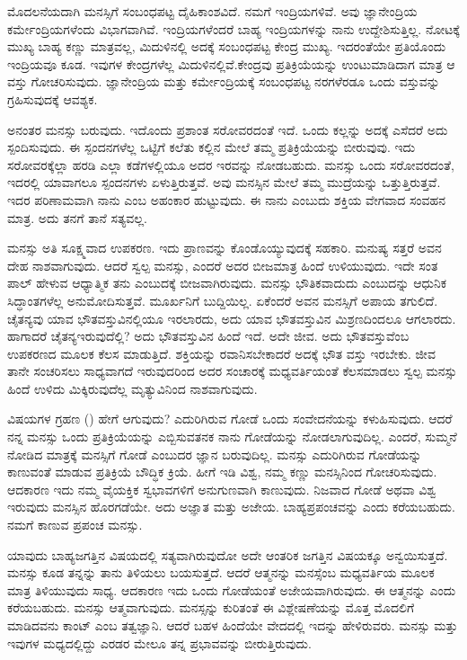 ಮೊದಲನೆಯದಾಗಿ ಮನಸ್ಸಿಗೆ ಸಂಬಂಧಪಟ್ಟ ದೈಹಿಕಾಂಶವಿದೆ. ನಮಗೆ ಇಂದ್ರಿಯಗಳಿವೆ. ಅವು ಜ್ಞಾನೇಂದ್ರಿಯ ಕರ್ಮೇಂದ್ರಿಯಗಳೆಂದು ವಿಭಾಗವಾಗಿವೆ. ಇಂದ್ರಿಯಗಳೆಂದರೆ ಬಾಹ್ಯ ಇಂದ್ರಿಯಗಳನ್ನು ನಾನು ಉದ್ದೇಶಿಸುತ್ತಿಲ್ಲ. ನೋಟಕ್ಕೆ ಮುಖ್ಯ ಬಾಹ್ಯ ಕಣ್ಣು ಮಾತ್ರವಲ್ಲ, ಮಿದುಳಿನಲ್ಲಿ ಅದಕ್ಕೆ ಸಂಬಂಧಪಟ್ಟ ಕೇಂದ್ರ ಮುಖ್ಯ. ಇದರಂತೆಯೇ ಪ್ರತಿಯೊಂದು ಇಂದ್ರಿಯವೂ ಕೂಡ. ಇವುಗಳ ಕೇಂದ್ರಗಳೆಲ್ಲ ಮಿದುಳಿನಲ್ಲಿವೆ.\break ಕೇಂದ್ರವು ಪ್ರತಿಕ್ರಿಯೆಯನ್ನು ಉಂಟುಮಾಡಿದಾಗ ಮಾತ್ರ ಆ ವಸ್ತು ಗೋಚರಿಸುವುದು. ಜ್ಞಾನೇಂದ್ರಿಯ ಮತ್ತು ಕರ್ಮೇಂದ್ರಿಯಕ್ಕೆ ಸಂಬಂಧಪಟ್ಟ ನರಗಳೆರಡೂ ಒಂದು ವಸ್ತುವನ್ನು ಗ್ರಹಿಸುವುದಕ್ಕೆ ಆವಶ್ಯಕ.

ಅನಂತರ ಮನಸ್ಸು ಬರುವುದು. ಇದೊಂದು ಪ್ರಶಾಂತ ಸರೋವರದಂತೆ ಇದೆ. ಒಂದು ಕಲ್ಲನ್ನು ಅದಕ್ಕೆ ಎಸೆದರೆ ಅದು ಸ್ಪಂದಿಸುವುದು. ಈ ಸ್ಪಂದನಗಳೆಲ್ಲ ಒಟ್ಟಿಗೆ ಕಲೆತು ಕಲ್ಲಿನ ಮೇಲೆ ತಮ್ಮ ಪ್ರತಿಕ್ರಿಯೆಯನ್ನು ಬೀರುವುವು. ಇದು ಸರೋವರಕ್ಕೆಲ್ಲಾ ಹರಡಿ ಎಲ್ಲಾ ಕಡೆಗಳಲ್ಲಿಯೂ ಅದರ ಇರವನ್ನು ನೋಡಬಹುದು. ಮನಸ್ಸು ಒಂದು ಸರೋವರದಂತೆ, ಇದರಲ್ಲಿ ಯಾವಾಗಲೂ ಸ್ಪಂದನಗಳು ಏಳುತ್ತಿರುತ್ತವೆ. ಅವು ಮನಸ್ಸಿನ ಮೇಲೆ ತಮ್ಮ ಮುದ್ರೆಯನ್ನು ಒತ್ತುತ್ತಿರುತ್ತವೆ. ಇದರ ಪರಿಣಾಮವಾಗಿ ನಾನು ಎಂಬ ಅಹಂಕಾರ ಹುಟ್ಟುವುದು. ಈ ನಾನು ಎಂಬುದು ಶಕ್ತಿಯ ವೇಗವಾದ ಸಂವಹನ ಮಾತ್ರ. ಅದು ತನಗೆ ತಾನೆ ಸತ್ಯವಲ್ಲ.

ಮನಸ್ಸು ಅತಿ ಸೂಕ್ಷ್ಮವಾದ ಉಪಕರಣ. ಇದು ಪ್ರಾಣವನ್ನು ಕೊಂಡೊಯ್ಯುವುದಕ್ಕೆ ಸಹಕಾರಿ. ಮನುಷ್ಯ ಸತ್ತರೆ ಅವನ ದೇಹ ನಾಶವಾಗುವುದು. ಆದರೆ ಸ್ವಲ್ಪ ಮನಸ್ಸು, ಎಂದರೆ ಅದರ ಬೀಜಮಾತ್ರ ಹಿಂದೆ ಉಳಿಯುವುದು. ಇದೇ ಸಂತ ಪಾಲ್ ಹೇಳುವ ಆಧ್ಯಾತ್ಮಿಕ ತನು ಎಂಬುದಕ್ಕೆ ಬೀಜವಾಗಿರುವುದು. ಮನಸ್ಸು ಭೌತಿಕವಾದುದು ಎಂಬುದನ್ನು ಆಧುನಿಕ ಸಿದ್ಧಾಂತಗಳೆಲ್ಲ ಅನುಮೋದಿಸುತ್ತವೆ. ಮೂರ್ಖನಿಗೆ ಬುದ್ದಿಯಿಲ್ಲ. ಏಕೆಂದರೆ ಅವನ ಮನಸ್ಸಿಗೆ ಅಪಾಯ ತಗುಲಿದೆ. ಚೈತನ್ಯವು ಯಾವ ಭೌತವಸ್ತುವಿನಲ್ಲಿಯೂ ಇರಲಾರದು, ಅದು ಯಾವ ಭೌತವಸ್ತುವಿನ ಮಿಶ್ರಣದಿಂದಲೂ ಆಗಲಾರದು. ಹಾಗಾದರೆ ಚೈತನ್ಯ\break ಇರುವುದೆಲ್ಲಿ? ಅದು ಭೌತವಸ್ತುವಿನ ಹಿಂದೆ ಇದೆ. ಅದೇ ಜೀವ. ಅದು ಭೌತವಸ್ತುವೆಂಬ ಉಪಕರಣದ ಮೂಲಕ ಕೆಲಸ ಮಾಡುತ್ತಿದೆ. ಶಕ್ತಿಯನ್ನು ರವಾನಿಸಬೇಕಾದರೆ ಅದಕ್ಕೆ ಭೌತ ವಸ್ತು ಇರಬೇಕು. ಜೀವ ತಾನೇ ಸಂಚರಿಸಲು ಸಾಧ್ಯವಾಗದೆ ಇರುವುದರಿಂದ ಅದರ ಸಂಚಾರಕ್ಕೆ ಮಧ್ಯವರ್ತಿಯಂತೆ ಕೆಲಸಮಾಡಲು ಸ್ವಲ್ಪ ಮನಸ್ಸು ಹಿಂದೆ ಉಳಿದು ಮಿಕ್ಕಿರುವುದೆಲ್ಲ ಮೃತ್ಯುವಿನಿಂದ ನಾಶವಾಗುವುದು.

ವಿಷಯಗಳ ಗ್ರಹಣ () ಹೇಗೆ ಆಗುವುದು? ಎದುರಿಗಿರುವ ಗೋಡೆ ಒಂದು ಸಂವೇದನೆಯನ್ನು ಕಳುಹಿಸುವುದು. ಆದರೆ ನನ್ನ ಮನಸ್ಸು ಒಂದು ಪ್ರತಿಕ್ರಿಯೆಯನ್ನು ಎಬ್ಬಿಸುವತನಕ ನಾನು ಗೋಡೆಯನ್ನು ನೋಡಲಾಗುವುದಿಲ್ಲ. ಎಂದರೆ, ಸುಮ್ಮನೆ ನೋಡಿದ ಮಾತ್ರಕ್ಕೆ ಮನಸ್ಸಿಗೆ ಗೋಡೆ ಎಂಬುದರ ಜ್ಞಾನ ಬರುವುದಿಲ್ಲ. ಮನಸ್ಸು ಎದುರಿಗಿರುವ ಗೋಡೆಯನ್ನು ಕಾಣುವಂತೆ ಮಾಡುವ ಪ್ರತಿಕ್ರಿಯೆ ಬೌದ್ಧಿಕ ಕ್ರಿಯೆ. ಹೀಗೆ ಇಡಿ ವಿಶ್ವ, ನಮ್ಮ ಕಣ್ಣು ಮನಸ್ಸಿನಿಂದ ಗೋಚರಿಸುವುದು. ಆದಕಾರಣ ಇದು ನಮ್ಮ ವೈಯಕ್ತಿಕ ಸ್ವಭಾವಗಳಿಗೆ ಅನುಗುಣವಾಗಿ ಕಾಣುವುದು. ನಿಜವಾದ ಗೋಡೆ ಅಥವಾ ವಿಶ್ವ ಇರುವುದು ಮನಸ್ಸಿನ ಹೊರಗಡೆಯೇ. ಅದು ಅಜ್ಞಾತ ಮತ್ತು ಅಜೇಯ. ಬಾಹ್ಯಪ್ರಪಂಚವನ್ನು  ಎಂದು ಕರೆಯಬಹುದು. ನಮಗೆ ಕಾಣುವ ಪ್ರಪಂಚ  ಮನಸ್ಸು.

ಯಾವುದು ಬಾಹ್ಯಜಗತ್ತಿನ ವಿಷಯದಲ್ಲಿ ಸತ್ಯವಾಗಿರುವುದೋ ಅದೇ ಆಂತರಿಕ ಜಗತ್ತಿನ ವಿಷಯಕ್ಕೂ ಅನ್ವಯಿಸುತ್ತದೆ. ಮನಸ್ಸು ಕೂಡ ತನ್ನನ್ನು ತಾನು ತಿಳಿಯಲು ಬಯಸುತ್ತದೆ. ಆದರೆ ಆತ್ಮನನ್ನು ಮನಸ್ಸೆಂಬ ಮಧ್ಯವರ್ತಿಯ ಮೂಲಕ ಮಾತ್ರ ತಿಳಿಯುವುದು ಸಾಧ್ಯ. ಆದಕಾರಣ ಇದು ಒಂದು ಗೋಡೆಯಂತೆ ಅಜೇಯವಾಗಿರುವುದು. ಈ ಆತ್ಮನನ್ನು  ಎಂದು ಕರೆಯಬಹುದು.  ಮನಸ್ಸು ಆತ್ಮವಾಗುವುದು. ಮನಸ್ಸನ್ನು ಕುರಿತಂತೆ ಈ ವಿಶ್ಲೇಷಣೆಯನ್ನು ಮೊತ್ತ ಮೊದಲಿಗೆ ಮಾಡಿದವನು ಕಾಂಟ್ ಎಂಬ ತತ್ವಜ್ಞಾನಿ. ಆದರೆ ಬಹಳ ಹಿಂದೆಯೇ ವೇದದಲ್ಲಿ ಇದನ್ನು ಹೇಳಿರುವರು. ಮನಸ್ಸು  ಮತ್ತು  ಇವುಗಳ ಮಧ್ಯದಲ್ಲಿದ್ದು ಎರಡರ ಮೇಲೂ ತನ್ನ ಪ್ರಭಾವವನ್ನು ಬೀರುತ್ತಿರುವುದು.

